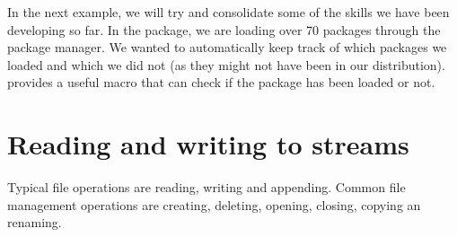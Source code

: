 In the next example, we will try and consolidate some of the skills we have been developing so far.
In the  package, we are loading over 70 packages through the package manager. We wanted
to automatically keep track of which packages we loaded and which we did not (as they might
not have been in our distribution). \latexe provides a useful macro 
that can check if the package has been loaded or not. 




\section{Reading and writing to streams}

Typical file operations are reading, writing and appending. Common file management operations are creating, deleting, opening, closing, copying an renaming.

